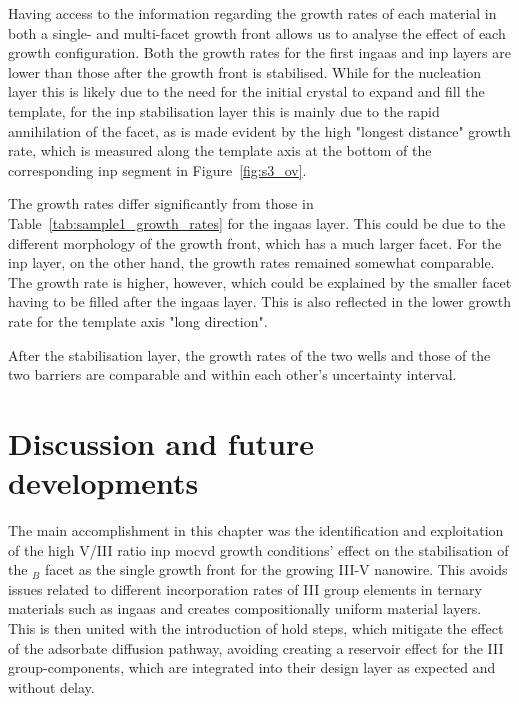 Having access to the information regarding the growth rates of each material in both a single- and multi-facet growth front allows us to analyse the effect of each growth configuration. Both the  growth rates for the first \acs{ingaas} and \acs{inp} layers are lower than those after the growth front is stabilised. While for the nucleation layer this is likely due to the need for the initial crystal to expand and fill the template, for the \acs{inp} stabilisation layer this is mainly due to the rapid annihilation of the  facet, as is made evident by the high "longest distance" growth rate, which is measured along the  template axis at the bottom of the corresponding \acs{inp} segment in Figure~\ref{fig:s3_ov}.

The growth rates differ significantly from those in Table~\ref{tab:sample1_growth_rates} for the \acs{ingaas} layer. This could be due to the different morphology of the growth front, which has a much larger  facet. For the \acs{inp} layer, on the other hand, the growth rates remained somewhat comparable. The  growth rate is higher, however, which could be explained by the smaller  facet having to be filled after the \acs{ingaas} layer. This is also reflected in the lower growth rate for the  template axis "long direction".

After the stabilisation layer, the growth rates of the two wells and those of the two barriers are comparable and within each other's uncertainty interval.
\par

\section{Discussion and future developments}

The main accomplishment in this chapter was the identification and exploitation of the high V/III ratio \acs{inp} \acs{mocvd} growth conditions' effect on the stabilisation of the \(_B\) facet as the single growth front for the growing III-V nanowire. This avoids issues related to different incorporation rates of III group elements in ternary materials such as \acs{ingaas} \cite{Borg2019} and creates compositionally uniform material layers. This is then united with the introduction of hold steps, which mitigate the effect of the adsorbate diffusion pathway, avoiding creating a reservoir effect for the III group-components, which are integrated into their design layer as expected and without delay. 

